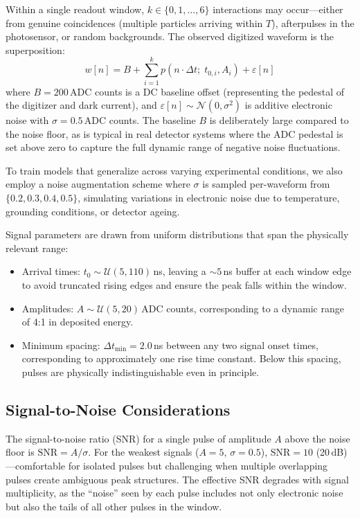 \documentclass[11pt,twocolumn]{article}
\begin{document}
Within a single readout window, $k \in \{0, 1, \ldots, 6\}$ interactions may occur---either from genuine coincidences (multiple particles arriving within $T$), afterpulses in the photosensor, or random backgrounds.
The observed digitized waveform is the superposition:
\begin{equation}
    w[n] = B + \sum_{i=1}^{k} p(n \cdot \Delta t;\; t_{0,i}, A_i) + \varepsilon[n]
    \label{eq:waveform}
\end{equation}
where $B = 200$\,ADC counts is a DC baseline offset (representing the pedestal of the digitizer and dark current), and $\varepsilon[n] \sim \mathcal{N}(0, \sigma^2)$ is additive electronic noise with $\sigma = 0.5$\,ADC counts.
The baseline $B$ is deliberately large compared to the noise floor, as is typical in real detector systems where the ADC pedestal is set above zero to capture the full dynamic range of negative noise fluctuations.

To train models that generalize across varying experimental conditions, we also employ a noise augmentation scheme where $\sigma$ is sampled per-waveform from $\{0.2, 0.3, 0.4, 0.5\}$, simulating variations in electronic noise due to temperature, grounding conditions, or detector ageing.

Signal parameters are drawn from uniform distributions that span the physically relevant range:
\begin{itemize}
    \item Arrival times: $t_0 \sim \mathcal{U}(5, 110)$\,ns, leaving a ${\sim}5$\,ns buffer at each window edge to avoid truncated rising edges and ensure the peak falls within the window.
    \item Amplitudes: $A \sim \mathcal{U}(5, 20)$\,ADC counts, corresponding to a dynamic range of 4:1 in deposited energy.
    \item Minimum spacing: $\Delta t_{\min} = 2.0$\,ns between any two signal onset times, corresponding to approximately one rise time constant. Below this spacing, pulses are physically indistinguishable even in principle.
\end{itemize}

\subsection{Signal-to-Noise Considerations}

The signal-to-noise ratio (SNR) for a single pulse of amplitude $A$ above the noise floor is $\text{SNR} = A / \sigma$.
For the weakest signals ($A = 5$, $\sigma = 0.5$), $\text{SNR} = 10$ (20\,dB)---comfortable for isolated pulses but challenging when multiple overlapping pulses create ambiguous peak structures.
The effective SNR degrades with signal multiplicity, as the ``noise'' seen by each pulse includes not only electronic noise but also the tails of all other pulses in the window.
\end{document}
